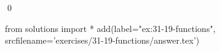 
\begin{ex}
  \label{ex:31-19-functions}
  
  \qed
\end{ex}
\begin{python0}
from solutions import *
add(label="ex:31-19-functions",
    srcfilename='exercises/31-19-functions/answer.tex')
\end{python0}
